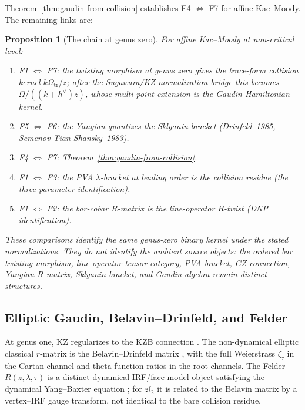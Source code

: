 \documentclass[11pt]{article}
\theoremstyle{plain}
\newtheorem{proposition}[theorem]{Proposition}
\theoremstyle{definition}
\theoremstyle{remark}
\numberwithin{equation}{section}
\begin{document}
Theorem~\ref{thm:gaudin-from-collision} establishes F4 $\Leftrightarrow$
F7 for affine Kac--Moody. The remaining links are:

\begin{proposition}[The chain at genus zero]\label{prop:chain}
For affine Kac--Moody at non-critical level:
\begin{enumerate}[label=\textup{(\roman*)}]
 \item F1 $\Leftrightarrow$ F7: the twisting morphism at genus zero
 gives the trace-form collision kernel \(k\Omega_{\mathrm{tr}}/z\);
 after the Sugawara/KZ normalization bridge this becomes
 \(\Omega/((k+h^\vee)z)\), whose multi-point extension is the
 Gaudin Hamiltonian kernel.
 \item F5 $\Leftrightarrow$ F6: the Yangian quantizes the Sklyanin
 bracket (Drinfeld~1985, Semenov-Tian-Shansky~1983).
 \item F4 $\Leftrightarrow$ F7: Theorem~\ref{thm:gaudin-from-collision}.
 \item F1 $\Leftrightarrow$ F3: the PVA $\lambda$-bracket at leading
 order is the collision residue (the three-parameter identification).
 \item F1 $\Leftrightarrow$ F2: the bar-cobar $R$-matrix is the
 line-operator $R$-twist (DNP identification).
\end{enumerate}
These comparisons identify the same genus-zero binary kernel under
the stated normalizations. They do not identify the ambient source
objects: the ordered bar twisting morphism, line-operator tensor
category, PVA bracket, GZ connection, Yangian \(R\)-matrix, Sklyanin
bracket, and Gaudin algebra remain distinct structures.
\end{proposition}

\subsection{Elliptic Gaudin, Belavin--Drinfeld, and Felder}
\label{sec:elliptic-gaudin}

At genus one, KZ regularizes to the KZB connection
\cite{Bernard88}. The
non-dynamical elliptic classical $r$-matrix is the Belavin--Drinfeld
matrix \cite{Belavin81,BelavinDrinfeld82}, with the full Weierstrass
\(\zeta_\tau\) in the Cartan channel and theta-function ratios in the
root channels. The Felder
$R(z,\lambda,\tau)$ is a distinct dynamical IRF/face-model object
satisfying the dynamical Yang--Baxter equation
\cite{Felder94,FelderVarchenko96,EtingofVarchenko98}; for
\(\mathfrak{sl}_2\) it is related to the Belavin matrix by a
vertex--IRF gauge transform, not identical to the bare collision
residue.
\end{document}
